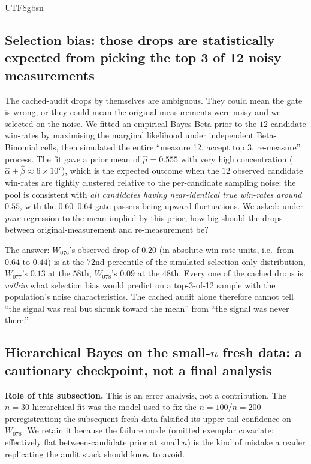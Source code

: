 \documentclass{article}
\begin{document}
\begin{CJK*}{UTF8}{gbsn}
\subsection{Selection bias: those drops are statistically
expected from picking the top 3 of 12 noisy measurements}
\label{sec:exp-summary-selbias}

The cached-audit drops by themselves are ambiguous. They could
mean the gate is wrong, or they could mean the original
measurements were noisy and we selected on the noise. We fitted
an empirical-Bayes Beta prior to the \(12\) candidate win-rates
by maximising the marginal likelihood under independent
Beta-Binomial cells, then simulated the entire ``measure 12,
accept top 3, re-measure'' process. The fit gave a prior mean of
\(\hat\mu = 0.555\) with very high concentration
(\(\hat\alpha + \hat\beta \approx 6 \times 10^7\)), which is the
expected outcome when the \(12\) observed candidate win-rates are
tightly clustered relative to the per-candidate sampling noise:
the pool is consistent with \emph{all candidates having
near-identical true win-rates around \(0.55\)}, with the
\(0.60\)--\(0.64\) gate-passers being upward fluctuations. We
asked: under \emph{pure} regression to the mean implied by this
prior, how big should the drops between original-measurement and
re-measurement be?

The answer: \(W_{076}\)'s observed drop of \(0.20\) (in absolute
win-rate units, i.e.\ from \(0.64\) to \(0.44\)) is at the
\(72\)nd percentile of the simulated selection-only distribution,
\(W_{077}\)'s \(0.13\) at the \(58\)th, \(W_{078}\)'s \(0.09\) at
the \(48\)th. Every one of
the cached drops is \emph{within} what selection bias would
predict on a top-3-of-12 sample with the population's noise
characteristics. The cached audit alone therefore cannot tell
``the signal was real but shrunk toward the mean'' from ``the
signal was never there.''

\subsection{Hierarchical Bayes on the small-\(n\) fresh data:
a cautionary checkpoint, not a final analysis}
\label{sec:exp-summary-bayes}

\noindent\textbf{Role of this subsection.} This is an error
analysis, not a contribution. The \(n=30\) hierarchical fit was
the model used to fix the \(n=100\)/\(n=200\) preregistration; the
subsequent fresh data falsified its upper-tail confidence on
\(W_{078}\). We retain it because the failure mode (omitted
exemplar covariate; effectively flat between-candidate prior at
small \(n\)) is the kind of mistake a reader replicating the
audit stack should know to avoid.



\end{CJK*}
\end{document}
